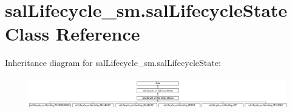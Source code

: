 \hypertarget{classsal_lifecycle__sm_1_1sal_lifecycle_state}{\section{sal\-Lifecycle\-\_\-sm.\-sal\-Lifecycle\-State Class Reference}
\label{classsal_lifecycle__sm_1_1sal_lifecycle_state}
}
Inheritance diagram for sal\-Lifecycle\-\_\-sm.\-sal\-Lifecycle\-State\-:\begin{figure}[H]
\begin{center}
\leavevmode
\includegraphics[height=1.441441cm]{classsal_lifecycle__sm_1_1sal_lifecycle_state}
\end{center}
\end{figure}
